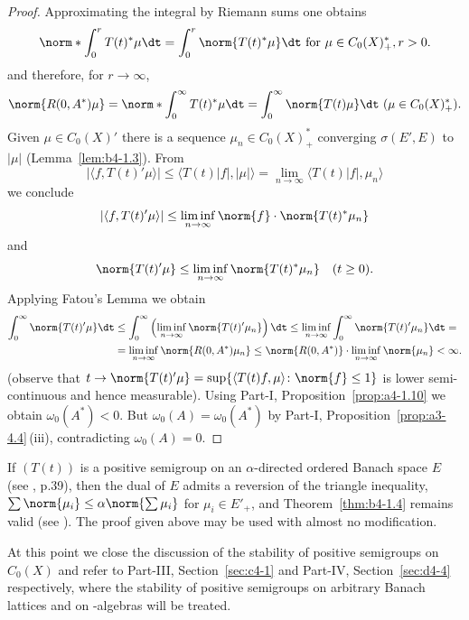 \begin{proof}
Approximating the integral by Riemann sums one obtains 
\[
\norm*{\int_0^r T(t)^*\mu \dt} = \int_0^r \norm{T(t)^*\mu} \dt \text{ for } \mu \in C_{0}(X)^*_{+} , r  >  0 .
\]
and therefore, for $r \to \infty$, 
\[
\norm{R(0,A^*)\mu} = \norm*{\int_0^{\infty} T(t)^*\mu \dt} 
 = \int_0^{\infty} \norm{T(t)\mu} \dt\  (\mu \in C_{0}(X)_{+}^{*}) .
\]
Given $\mu \in C_{0}(X)'$ there is a sequence $\mu_n \in C_{0}(X)^*_+$ converging $\sigma(E',E)$ to $|\mu|$ (Lemma~\ref{lem:b4-1.3}).
From 
%
\[
	 |\langle f,T(t)'\mu \rangle| \leq \langle T(t)|f|,|\mu| \rangle = \lim_{n\to\infty} \langle T(t)|f|,\mu_n \rangle 
\]
%
we conclude 
%
\[
	 |\langle f,T(t)'\mu \rangle| \leq \liminf_{n\to\infty}\norm{f} \cdot \norm{T(t)^*\mu_n} 
\]
%
and 
%
\[
	 \norm{T(t)'\mu} \leq \liminf_{n\to\infty}\norm{T(t)^*\mu_n} \quad (t \geq 0) .
\]
%
Applying Fatou's Lemma we obtain 
\[
\begin{aligned}
	\int_0^{\infty} \norm{T(t)'\mu} \dt &\leq \int_0^{\infty} \left(\liminf_{n\to\infty} \norm{T(t)'\mu_n}\right) \dt \leq  
	\liminf_{n\to\infty} \int_0^{\infty} \norm{T(t)'\mu_n} \dt = \\ 
	& = \liminf_{n\to\infty} \norm{R(0,A^{*})\mu_n} \leq \norm{R(0,A^{*})}\cdot\liminf_{n\to\infty} \norm{\mu_n} < \infty .
\end{aligned}
\]
(observe that $t \to \norm{T(t)'\mu} = \sup \{\langle T(t)f,\mu \rangle \colon \norm{f} \leq 1\}$ is lower semi-continuous and hence measurable). 
Using Part-I, Proposition~\ref{prop:a4-1.10} we obtain $\omega_{0}(A^{*})<0$. 
But $\omega_{0}(A) = \omega_{0}(A^{*})$ by Part-I, Proposition~\ref{prop:a3-4.4}\,(iii), contradicting $\omega_{0}(A) = 0$.
\end{proof}

\begin{remark}\label{rem:b4-1.5}%
If\/ $(T(t))$ is a positive semigroup on an $\alpha$-directed ordered Banach space $E$ (see \textcite{asimow:1980}, p.39), 
then the dual of\/ $E$ admits a reversion of the triangle inequality, 
\ie $\sum\norm{\mu_i} \leq \alpha\norm{\sum\mu_i}$ 
for $\mu_i \in E'_+$, 
and Theorem~\ref{thm:b4-1.4} remains valid (see \textcite{battydavies:1983}). 
The proof given above may be used with almost no modification.
\end{remark}

At this point we close the discussion of the stability of positive semigroups on $C_{0}(X)$ and refer to Part-III, Section~\ref{sec:c4-1} and Part-IV, Section~\ref{sec:d4-4}  respectively, where the stability of positive semigroups on arbitrary Banach lattices and on \CA-algebras will be treated.
